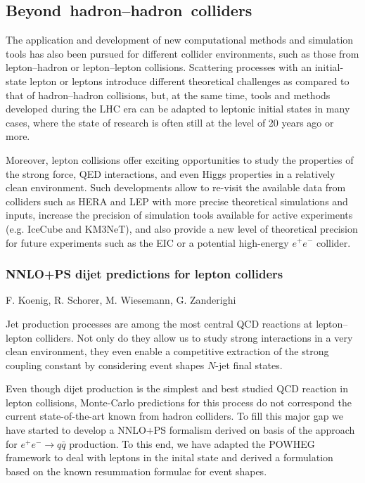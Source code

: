 \documentclass{FBR_Bericht_2025}
\begin{document}
\subsection{\mbox{Beyond hadron--hadron colliders}}
\begin{refsection}
The application and development of new computational methods and simulation tools has also 
been pursued for different collider environments, such as those from lepton--hadron or lepton--lepton collisions.
%
Scattering processes with an initial-state lepton or leptons introduce different theoretical 
challenges as compared to that of hadron--hadron collisions, but, at the same time, tools
and methods developed during the LHC era can be adapted to leptonic initial states
in many cases, where the state of research is often still at the level of 20 years ago or more.

Moreover, lepton collisions offer exciting opportunities to study the properties of the strong force, QED interactions, and even Higgs properties in a relatively clean environment.
%
Such developments allow to re-visit the available data from colliders such as HERA and LEP with more precise theoretical simulations and inputs, increase the precision of simulation tools available for active experiments (e.g. IceCube and KM3NeT), and also provide a new level of theoretical precision for future experiments such as the EIC or a potential high-energy $e^+e^-$ collider. 
%
\subsubsection{NNLO+PS dijet predictions for lepton colliders}
\begin{Namen}
F. Koenig, R. Schorer, M. Wiesemann, G. Zanderighi
\end{Namen}

Jet production processes are among the most central QCD reactions at lepton--lepton colliders.
Not only do they allow us to study strong interactions in a very clean environment, they even 
enable a competitive extraction of the strong coupling constant by considering event shapes 
$N$-jet final states.

Even though dijet production is the simplest and best studied QCD reaction in lepton collisions,
Monte-Carlo predictions for this process do not correspond the current state-of-the-art known
from hadron colliders. To fill this major gap we have started to develop a NNLO+PS formalism
derived on basis of the \minnlo{} approach for $e^+e^-\to q\bar q$ production. To this end,
we have adapted the POWHEG framework to deal with leptons in the inital state and derived
a \minnlo{} formulation based on the known resummation formulae for event shapes.


\end{refsection}
\end{document}

